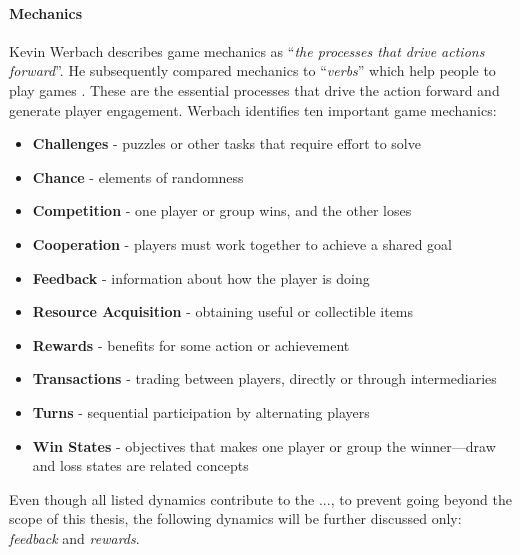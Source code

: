 \paragraph{Mechanics}
Kevin Werbach describes game mechanics as ``\textit{the processes that drive actions forward}''. He subsequently compared mechanics to ``\textit{verbs}'' which help people to play games \cite{werbach2012win}. These are the essential processes that drive the action forward and generate player engagement. Werbach identifies ten important game mechanics:
\begin{itemize}
\item \textbf{Challenges} - puzzles or other tasks that require effort to solve
\item \textbf{Chance} - elements of randomness
\item \textbf{Competition} - one player or group wins, and the other loses 
\item \textbf{Cooperation} - players must work together to achieve a shared goal
\item \textbf{Feedback} - information about how the player is doing
\item \textbf{Resource Acquisition} - obtaining useful or collectible items
\item \textbf{Rewards} - benefits for some action or achievement
\item \textbf{Transactions} - trading between players, directly or through intermediaries
\item \textbf{Turns} - sequential participation by alternating players
\item \textbf{Win States} - objectives that makes one player or group the winner—draw and loss states are
related concepts
\end{itemize}
Even though all listed dynamics contribute to the ..., to prevent going beyond the scope of this thesis, the following dynamics will be further discussed only: \textit{feedback} and \textit{rewards}.

